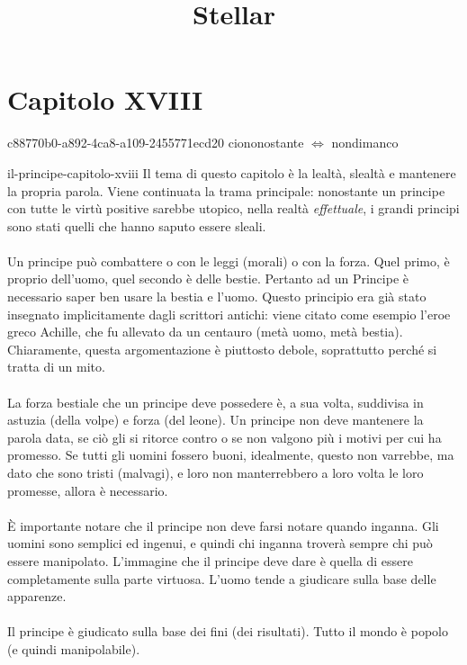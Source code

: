 \documentclass[preview]{standalone}
\begin{document}
\title{Stellar}
\genpage

\section{Capitolo XVIII}

\begin{snippetnote}{c88770b0-a892-4ca8-a109-2455771ecd20}{}
    ciononostante \(\iff\) nondimanco
\end{snippetnote}

\begin{snippet}{il-principe-capitolo-xviii}
    Il tema di questo capitolo è la lealtà, slealtà e mantenere
    la propria parola.
    Viene continuata la trama principale:
    nonostante un principe con tutte le virtù positive
    sarebbe utopico, nella realtà \textit{effettuale},
    i grandi principi sono stati quelli che hanno saputo essere sleali.
    \\\\
    Un principe può combattere o con le leggi (morali)
    o con la forza. Quel primo, è proprio dell'uomo, quel secondo
    è delle bestie.
    Pertanto ad un Principe è necessario saper ben usare la bestia e l'uomo.
    Questo principio era già stato insegnato implicitamente dagli scrittori antichi:
    viene citato come esempio l'eroe greco Achille, che fu allevato
    da un centauro (metà uomo, metà bestia).
    Chiaramente, questa argomentazione è piuttosto debole,
    soprattutto perché si tratta di un mito.
    \\\\
    La forza bestiale che un principe deve possedere è, a sua volta,
    suddivisa in astuzia (della volpe) e forza (del leone).
    Un principe non deve mantenere la parola data, se ciò
    gli si ritorce contro o se non valgono più i motivi per cui ha promesso.
    Se tutti gli uomini fossero buoni, idealmente, questo non varrebbe,
    ma dato che sono tristi (malvagi), e loro non manterrebbero
    a loro volta le loro promesse, allora è necessario.
    \\\\
    È importante notare che il principe non deve farsi notare
    quando inganna. Gli uomini sono semplici ed ingenui, e quindi
    chi inganna troverà sempre chi può essere manipolato.
    L'immagine che il principe deve dare
    è quella di essere completamente sulla parte virtuosa.
    L'uomo tende a giudicare sulla base delle apparenze.
    \\\\
    Il principe è giudicato sulla base dei fini (dei risultati).
    Tutto il mondo è popolo (e quindi manipolabile).
\end{snippet}
\end{document}
